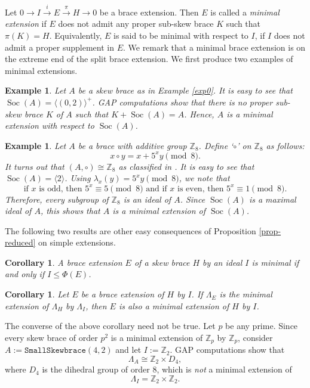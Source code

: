 \documentclass[11pt]{amsart}
\theoremstyle{thrm}
\theoremstyle{plain}
\newtheorem{cor}[thm]{Corollary}
\newtheorem{example}[thm]{Example}
\theoremstyle{definition}
\newcommand{\Soc}{\operatorname{Soc} }
\numberwithin{equation}{section}
\begin{document}
Let  $0 \longrightarrow I \xrightarrow{i} E \xrightarrow{\pi} H \longrightarrow 0$ be a brace extension. Then $E$ is called a \emph{minimal extension} if $E$ does not admit any proper sub-skew brace $K$ such that $\pi(K) = H$.  Equivalently, $E$ is  said to be minimal with respect to $I$,  if $I$ does not admit a proper supplement in $E$. We remark that a minimal brace extension is on the extreme end of the split brace extension. We first produce two examples of  minimal extensions.

\begin{example}
	Let $A$ be a skew brace  as in Example \ref{exp0}. It is easy to see that $\Soc(A) = \langle (0,2) \rangle^+$. GAP computations show that there is no proper sub-skew brace $K$ of $A$ such that $K + \Soc(A) = A$. Hence, $A$ is a minimal extension with respect to $\Soc(A)$.
\end{example}	

\begin{example}
Let $A$ be a  brace with additive group $\mathbb{Z}_8$. Define  `$\circ$' on $\mathbb{Z}_8$ as follows:
\[
x \circ y = x + 5^{x}y \pmod{8}.
\]
It turns out that $(A,\circ) \cong \mathbb{Z}_8$ as classified in \cite{Bach15}.  
It is easy to see that $\Soc(A)=\langle 2 \rangle$. Using $\lambda_x(y)=5^x y \pmod{8}$, we note that
\[
\text{if $x$ is odd, then } 5^{x} \equiv 5 \pmod{8}
\mbox{ and }
\text{if $x$ is even, then } 5^{x} \equiv 1 \pmod{8}.
\]
Therefore, every subgroup of $\mathbb{Z}_8$ is an ideal of $A$.  
Since $\Soc(A)$ is a maximal ideal of $A$, this shows that $A$ is a minimal extension of $\Soc(A)$.
\end{example}

The following two results are other  easy consequences of Proposition \ref{prop-reduced} on simple extensions.
\begin{cor}
A brace extension $E$ of a skew brace $H$ by an ideal $I$ is minimal if and only if $I \leq \Phi(E)$.
\end{cor}

\begin{cor}
	Let $E$ be a brace  extension of $H$ by $I$. If $\Lambda_E$ is the minimal extension of $\Lambda_H$ by $\Lambda_I$, then $E$ is also a minimal extension of $H$ by $I$.
\end{cor}


The converse of the above corollary need not be true.  
Let $p$ be any prime. Since every skew brace of order $p^2$ is a minimal extension of $\mathbb{Z}_p$ by $\mathbb{Z}_p$, consider 
$A := \texttt{SmallSkewbrace}(4,2)$ and let $I := \mathbb{Z}_2$.  GAP computations show that 
\[
\Lambda_A \cong \mathbb{Z}_2 \times D_4,
\] 
where $D_4$ is the dihedral group of order $8$, which is \emph{not} a minimal extension of 
\[
\Lambda_I = \mathbb{Z}_2 \times \mathbb{Z}_2.
\]
\end{document}
